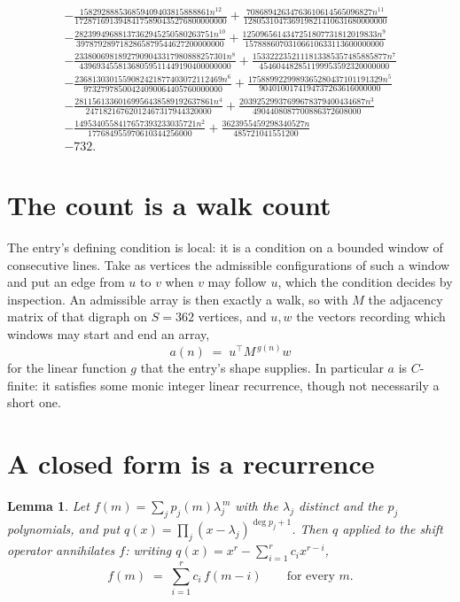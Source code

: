 \documentclass[11pt,a4paper]{article}
\theoremstyle{plain}
\newtheorem{lemma}[theorem]{Lemma}
\theoremstyle{definition}
\begin{document}
\begin{multline*}
- \frac{158292888536859409403815888861 n^{12}}{17287169139484175890435276800000000} + \frac{70868942634763610614565096827 n^{11}}{128053104736919821410631680000000} \\
- \frac{28239949688137362945250580263751 n^{10}}{3978792897182865879544627200000000} + \frac{1250965614347251807731812019833 n^{9}}{15788860703106610633113600000000} \\
- \frac{23380069818927909043317980888257301 n^{8}}{43969345581368059511449190400000000} + \frac{1533222352111813385357485885877 n^{7}}{454604482851199953592320000000} \\
- \frac{2368130301559082421877403072112469 n^{6}}{97327978500424090064405760000000} + \frac{1758899229989365280437101191329 n^{5}}{9040100174194737263616000000} \\
- \frac{28115613360169956438589192637861 n^{4}}{24718216762012467317944320000} + \frac{20392529937699678379400434687 n^{3}}{4904408087700886372608000} \\
- \frac{1495340558417657393233035721 n^{2}}{177684955970610344256000} + \frac{3623955459298340527 n}{485721041551200} \\
- 732.
\end{multline*}

\section{The count is a walk count}

The entry's defining condition is local: it is a condition on a bounded window of consecutive lines. Take as vertices the
admissible configurations of such a window and put an edge from $u$ to $v$ when $v$ may
follow $u$, which the condition decides by inspection. An admissible array is then exactly a
walk, so with $M$ the adjacency matrix of that digraph on $S=362$ vertices, and $u,w$ the
vectors recording which windows may start and end an array,
\[
a(n)\;=\;u^{\!\top}M^{\,g(n)}w
\]
for the linear function $g$ that the entry's shape supplies. In particular $a$ is
$C$-finite: it satisfies some monic integer linear recurrence, though not necessarily a short
one.

\section{A closed form is a recurrence}

\begin{lemma}\label{lem:ann}
Let $f(m)=\sum_{j}p_j(m)\lambda_j^{\,m}$ with the $\lambda_j$ distinct and the $p_j$
polynomials, and put $q(x)=\prod_j(x-\lambda_j)^{\deg p_j+1}$. Then $q$ applied to the shift
operator annihilates $f$: writing $q(x)=x^{r}-\sum_{i=1}^{r}c_ix^{r-i}$,
\[
f(m)\;=\;\sum_{i=1}^{r}c_i\,f(m-i)\qquad\text{for every }m.
\]
\end{lemma}
\end{document}
